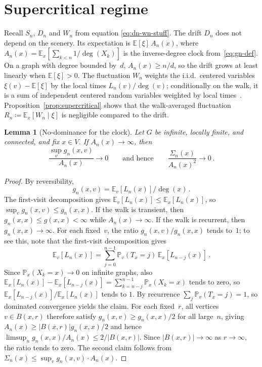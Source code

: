 \documentclass[11pt]{amsart}
\theoremstyle{plain}
\newtheorem{lemma}[theorem]{Lemma}
\theoremstyle{definition}
\newcommand{\E}{\mathbb{E}}
\renewcommand{\P}{\mathbb{P}}
\begin{document}
	\section{Supercritical regime}\label{sec:supercritical}
	
	Recall $S_n$, $D_n$ and $W_n$ from equation \eqref{eq:dn-wn-stuff}.
	The drift $D_n$ does not depend on the scenery. Its expectation is $\E[\xi]\,A_n(x)$, where $A_n(x)=\E_x[\sum_{k<n}1/\deg(X_k)]$ is the inverse-degree clock from~\eqref{eq:gn-def}. On a graph with degree bounded by~$d$, $A_n(x)\geq n/d$, so the drift grows at least linearly when $\E[\xi]>0$. The fluctuation $W_n$ weights the i.i.d.\ centered variables $\xi(v)-\E[\xi]$ by the local times $L_n(v)/\deg(v)$; conditionally on the walk, it is a sum of independent centered random variables weighted by local times~\citep{KestenSpitzer79}. Proposition~\ref{prop:supercritical} shows that the walk-averaged fluctuation $R_n\coloneqq\E_x[W_n\mid\xi]$ is negligible compared to the drift.
	
	\begin{lemma}[No-dominance for the clock]\label{lem:clock-no-dom}
		Let $G$ be infinite, locally finite, and connected, and fix $x\in V$. If $A_n(x)\to\infty$, then
		\[
		\frac{\sup_v g_n(x,v)}{A_n(x)}\to 0\qquad\text{and hence}\qquad\frac{\Sigma_n(x)}{A_n(x)^2}\to 0\,.
		\]
	\end{lemma}
	\begin{proof}
		By reversibility,
		\[
		g_n(x,v)=\E_v[L_n(x)]/\deg(x)\,.
		\]
		The first-visit decomposition gives $\E_v[L_n(x)]\leq\E_x[L_n(x)]$, so $\sup_v g_n(x,v)\leq g_n(x,x)$.
		If the walk is transient, then $g_n(x,x)\leq g(x,x)<\infty$ while $A_n(x)\to\infty$. If the walk is recurrent, then $g_n(x,x)\to\infty$. For each fixed~$v$, the ratio $g_n(x,v)/g_n(x,x)$ tends to~$1$; to see this, note that the first-visit decomposition gives
		\[
		\E_v[L_n(x)]=\sum_{j=0}^{n-1}\P_v(T_x=j)\,\E_x[L_{n-j}(x)]\,.
		\]
		Since $\P_x(X_k=x)\to 0$ on infinite graphs, %
		also $\E_x[L_n(x)]-\E_x[L_{n-j}(x)]=\sum_{k=n-j}^{n-1}\P_x(X_k=x)$
		tends to zero, so $\E_x[L_{n-j}(x)]/\E_x[L_n(x)]$ tends to $1$. By recurrence $\sum_j\P_v(T_x=j)=1$, so dominated convergence yields the claim. For each fixed~$r$, all vertices $v\in B(x,r)$ therefore satisfy $g_n(x,v)\geq g_n(x,x)/2$ for all large~$n$, giving $A_n(x)\geq|B(x,r)|g_n(x,x)/2$ and hence $\limsup_n g_n(x,x)/A_n(x)\leq 2/|B(x,r)|$. Since $|B(x,r)|\to\infty$ as $r\to\infty$, the ratio tends to zero. The second claim follows from $\Sigma_n(x)\leq\sup_v g_n(x,v)\cdot A_n(x)$.
	\end{proof}
	
\end{document}
